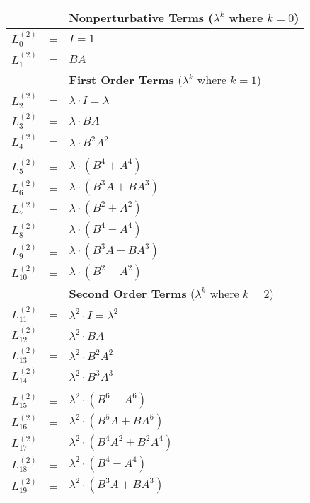 \documentclass{article}
\begin{document}
\begin{table}[!hp]
\begin{center}
\begin{tabular}{rcl}
               &   & \textbf{Nonperturbative Terms} ($\lambda^{k}$ where $k=0$) \\
\hline
$L_{0}^{(2)}$  & = & $I = 1$ \\
$L_{1}^{(2)}$  & = & $BA$ \\
               &   & \textbf{First Order Terms} ($\lambda^{k}$ where $k=1$) \\
\hline         
$L_{2}^{(2)}$  & = & ${\lambda}{\cdot}I = {\lambda}$ \\
$L_{3}^{(2)}$  & = & ${\lambda}{\cdot}BA$ \\
$L_{4}^{(2)}$  & = & ${\lambda}{\cdot}B^{2}A^{2}$ \\
               &   & \\
$L_{5}^{(2)}$  & = & ${\lambda}{\cdot}(B^{4}+A^{4})$ \\
$L_{6}^{(2)}$  & = & ${\lambda}{\cdot}(B^{3}A+BA^{3})$ \\
$L_{7}^{(2)}$  & = & ${\lambda}{\cdot}(B^{2}+A^{2})$ \\
$L_{8}^{(2)}$  & = & ${\lambda}{\cdot}(B^{4}-A^{4})$ \\
$L_{9}^{(2)}$  & = & ${\lambda}{\cdot}(B^{3}A-BA^{3})$ \\
$L_{10}^{(2)}$ & = & ${\lambda}{\cdot}(B^{2}-A^{2})$ \\
               &   & \textbf{Second Order Terms} ($\lambda^{k}$ where $k=2$) \\
\hline         
$L_{11}^{(2)}$ & = & ${\lambda}^{2}{\cdot}I = {\lambda}^{2}$ \\
$L_{12}^{(2)}$ & = & ${\lambda}^{2}{\cdot}BA$ \\
$L_{13}^{(2)}$ & = & ${\lambda}^{2}{\cdot}B^{2}A^{2}$ \\
$L_{14}^{(2)}$ & = & ${\lambda}^{2}{\cdot}B^{3}A^{3}$ \\
               &   & \\
$L_{15}^{(2)}$ & = & ${\lambda}^{2}{\cdot}(B^{6}+A^{6})$ \\
$L_{16}^{(2)}$ & = & ${\lambda}^{2}{\cdot}(B^{5}A+BA^{5})$ \\
$L_{17}^{(2)}$ & = & ${\lambda}^{2}{\cdot}(B^{4}A^{2}+B^{2}A^{4})$ \\
$L_{18}^{(2)}$ & = & ${\lambda}^{2}{\cdot}(B^{4}+A^{4})$ \\
$L_{19}^{(2)}$ & = & ${\lambda}^{2}{\cdot}(B^{3}A+BA^{3})$ \\

\end{tabular}
\end{center}
\end{table}
\end{document}
